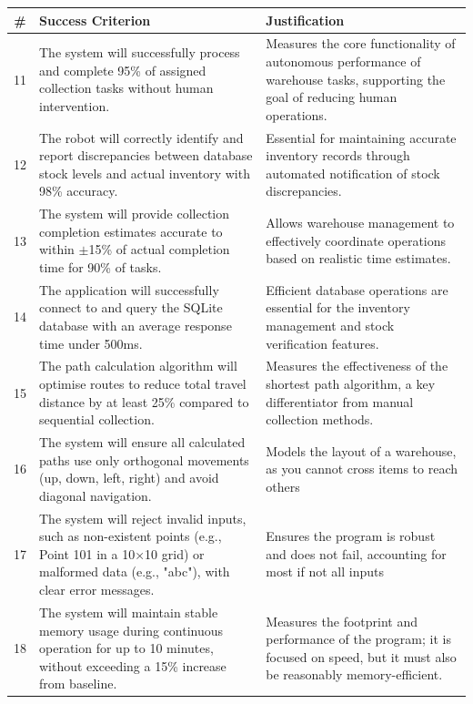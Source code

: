 \begin{table}[htbp]
\centering
\begin{tabularx}{\textwidth}{|c|X|X|}
\hline
\textbf{\#} & \textbf{Success Criterion} & \textbf{Justification} \\
\hline
11 & The system will successfully process and complete 95\% of assigned collection tasks without human intervention. & Measures the core functionality of autonomous performance of warehouse tasks, supporting the goal of reducing human operations. \\
\hline
12 & The robot will correctly identify and report discrepancies between database stock levels and actual inventory with 98\% accuracy. & Essential for maintaining accurate inventory records through automated notification of stock discrepancies. \\
\hline
13 & The system will provide collection completion estimates accurate to within $\pm$15\% of actual completion time for 90\% of tasks. & Allows warehouse management to effectively coordinate operations based on realistic time estimates. \\
\hline
14 & The application will successfully connect to and query the SQLite database with an average response time under 500ms. & Efficient database operations are essential for the inventory management and stock verification features. \\
\hline
15 & The path calculation algorithm will optimise routes to reduce total travel distance by at least 25\% compared to sequential collection. & Measures the effectiveness of the shortest path algorithm, a key differentiator from manual collection methods. \\
\hline
16 & The system will ensure all calculated paths use only orthogonal movements (up, down, left, right) and avoid diagonal navigation. & Models the layout of a warehouse, as you cannot cross items to reach others \\
\hline
17 & The system will reject invalid inputs, such as non-existent points (e.g., Point 101 in a 10×10 grid) or malformed data (e.g., "abc"), with clear error messages. & Ensures the program is robust and does not fail, accounting for most if not all inputs \\
\hline
18 & The system will maintain stable memory usage during continuous operation for up to 10 minutes, without exceeding a 15\% increase from baseline. & Measures the footprint and performance of the program; it is focused on speed, but it must also be reasonably memory-efficient. \\

\end{tabularx}
\end{table}
